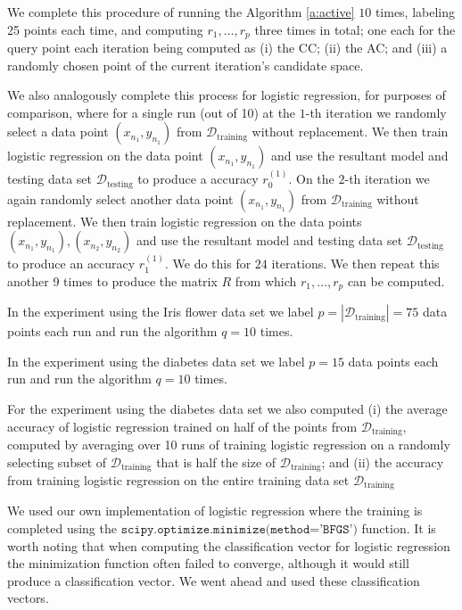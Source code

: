 \documentclass[11pt]{amsart}
\theoremstyle{definition}
\theoremstyle{remark}
\begin{document}
        We complete this procedure of running the Algorithm \ref{a:active} $10$ times, labeling 25 points each time, and computing $r_1, \dots, r_p$ three times in total; one each for the query point each iteration being computed as (i) the CC; (ii) the AC; and (iii) a randomly chosen point of the current iteration's candidate space. 

        We also analogously complete this process for logistic regression, for purposes of comparison, where for a single run (out of 10) at the $1$-th iteration we randomly select a data point $(x_{n_1}, y_{n_1})$ from $\mathcal{D}_\text{training}$ without replacement. We then train logistic regression on the data point $(x_{n_1}, y_{n_1})$ and use the resultant model and testing data set $\mathcal{D}_\text{testing}$ to produce a accuracy $r_0^{(1)}$. On the $2$-th iteration we again randomly select another data point $(x_{n_1}, y_{n_1})$ from $\mathcal{D}_\text{training}$ without replacement. We then train logistic regression on the data points $(x_{n_1}, y_{n_1}), (x_{n_2}, y_{n_2})$ and use the resultant model and testing data set $\mathcal{D}_\text{testing}$ to produce an accuracy $r_1^{(1)}$. We do this for $24$ iterations. We then repeat this another 9 times to produce the matrix $R$ from which $r_1, \dots, r_p$ can be computed.

        In the experiment using the Iris flower data set we label $p = |\mathcal{D}_\text{training}| = 75$ data points each run and run the algorithm $q = 10$ times. 

        In the experiment using the diabetes data set we label $p = 15$ data points each run and run the algorithm $q = 10$ times. 

        For the experiment using the diabetes data set we also computed (i) the average accuracy of logistic regression trained on half of the points from $\mathcal{D}_\text{training}$, computed by averaging over 10 runs of training logistic regression on a randomly selecting subset of $\mathcal{D}_\text{training}$ that is half the size of $\mathcal{D}_\text{training}$; and (ii) the accuracy from training logistic regression on the entire training data set $\mathcal{D}_\text{training}$

        We used our own implementation of logistic regression where the training is completed using the $\texttt{scipy.optimize.minimize(method='BFGS')}$ function. It is worth noting that when computing the classification vector for logistic regression the minimization function  often failed to converge, although it would still produce a classification vector. We went ahead and used these classification vectors.
\end{document}
